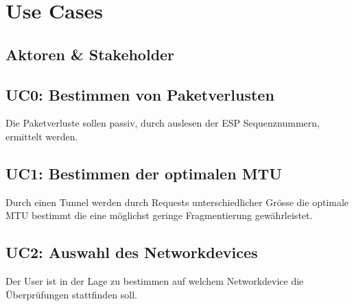 \section{Use Cases}
\label{sec:Use Cases}


\subsection{Aktoren \& Stakeholder}


\subsection{UC0: Bestimmen von Paketverlusten}
Die Paketverluste sollen passiv, durch auslesen der ESP Sequenznummern, ermittelt werden.

\subsection{UC1: Bestimmen der optimalen MTU}
Durch einen Tunnel werden durch Requests unterschiedlicher Grösse die optimale MTU bestimmt die eine möglichst geringe Fragmentierung gewährleistet.

\subsection{UC2: Auswahl des Networkdevices}
Der User ist in der Lage zu bestimmen auf welchem Networkdevice die Überprüfungen stattfinden soll.